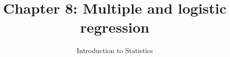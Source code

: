 \documentclass[slidestop,compress,mathserif]{beamer}
\title[Chp 8: Multiple and logistic regression]{Chapter 8: Multiple and logistic regression}
\author{Introduction to Statistics}
\date{}
\institute{}
\begin{document}


\begin{frame}[plain]

\titlepage

\end{frame}








\end{document}
